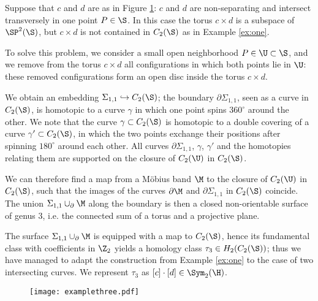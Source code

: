 \begin{ex}
 \label{ex:three}
 Suppose that $c$ and $d$ are as in Figure \ref{fig:examplethree}: $c$ and $d$ are non-separating and 
intersect transversely in one point $P\in\S$. In this case the torus $c\times d$ is a subspace
of $\SP^2(\S)$, but $c\times d$ is not contained in $C_2(\S)$ as in Example \ref{ex:one}.

To solve this problem, we consider a small open neighborhood $P\in \U\subset\S$, and we remove from the torus $c\times d$
all configurations in which both points lie in $\U$: these removed configurations form an open disc inside the torus $c\times d$.

We obtain an embedding $\Sigma_{1,1}\hookrightarrow C_2(\S)$;
the boundary $\partial\Sigma_{1,1}$,
seen as a curve in $C_2(\S)$, is homotopic to a curve $\gamma$ in which one point spins $360^{\circ}$ around the other.
We note that the curve $\gamma\subset C_2(\S)$ is homotopic to a double covering of a curve $\gamma'\subset C_2(\S)$,
in which the two points exchange their positions after spinning $180^{\circ}$ around each other. All curves
$\partial\Sigma_{1,1}$, $\gamma$, $\gamma'$ and the homotopies relating them
are supported on the closure of $C_2(\U)$ in $C_2(\S)$.

We can therefore find a map from a M\"{o}bius band $\M$ to the closure of $C_2(\U)$ in $C_2(\S)$,
such that the images of the curves $\partial\M$ and $\partial\Sigma_{1,1}$ in $C_2(\S)$ coincide.
The union $\Sigma_{1,1}\cup_{\partial}\M$ along the boundary is then a closed
non-orientable surface of genus $3$, i.e. the connected sum of a torus and a projective plane.

The surface $\Sigma_{1,1}\cup_{\partial}\M$ is equipped with a map to $C_2(\S)$, hence its fundamental class with coefficients
in $\Z_2$ yields a homology class $\tau_3\in H_2(C_2(\S))$; thus we have managed to adapt
the construction from Example \ref{ex:one} to the case of two intersecting curves. We represent $\tau_3$
as $[c]\cdot[d]\in\Sym_2(\H)$.
\end{ex}
\begin{figure}[h]\centering
 \texttt{[image: examplethree.pdf]}
 \caption{}
\label{fig:examplethree}
\end{figure}

